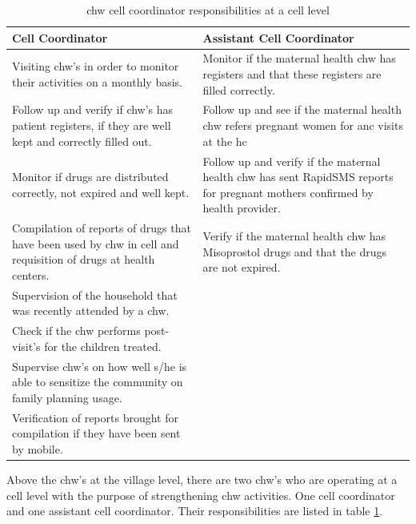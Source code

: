 \begin{table}
\centering
\begin{tabular}{|p{6cm}|p{6cm}|}
\hline
\large{Cell Coordinator} & \large{Assistant Cell Coordinator} \\
\hline
Visiting \gls{chw}'s in order to monitor their activities on a monthly basis. & Monitor if the maternal health \gls{chw} has registers and that these registers are filled correctly. \\
\hline
Follow up and verify if \gls{chw}'s has patient registers, if they are well kept and correctly filled out. & Follow up and see if the maternal health \gls{chw} refers pregnant women for \gls{anc} visits at the \gls{hc} \\
\hline
Monitor if drugs are distributed correctly, not expired and well kept. & Follow up and verify if  the maternal health \gls{chw} has sent RapidSMS reports for pregnant mothers confirmed by health provider.\\
\hline
Compilation of reports of drugs that have been used by \gls{chw} in cell and requisition of drugs at health centers. & Verify if the maternal health \gls{chw} has Misoprostol drugs and that the drugs are not expired. \\
\hline
Supervision of the household that was recently attended by a \gls{chw}. & \\
\cline{1-1}
Check if the \gls{chw} performs post-visit's for the children treated. & \\
\cline{1-1}
Supervise \gls{chw}'s on how well s/he is able to sensitize the community on family planning usage. & \\
\cline{1-1}
Verification of reports brought for compilation if they have been sent by mobile. & \\
\hline
\end{tabular}
\caption{\gls{chw} cell coordinator responsibilities at a cell level}
\label{table:cellcoordinator}
\end{table}

Above the \gls{chw}'s at the village level, there are two \gls{chw}'s who are operating at a cell level with the purpose of strengthening \gls{chw} activities. One cell coordinator and one assistant cell coordinator. Their responsibilities are listed in table \ref{table:cellcoordinator}.


